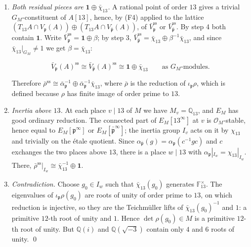 \documentclass[11pt]{article}
\newcommand{\Q}{\mathbb Q}
\newcommand{\F}{\mathbb F}
\begin{document}
\begin{enumerate}
\item \emph{Both residual pieces are \(\mathbf 1\oplus\bar\chi_{13}\).} A rational point of order \(13\) gives a
          trivial \(G_M\)-constituent of \(A[13]\), hence, by (F4) applied to the lattice
          \((T_{13}A\cap V_{\mathfrak p}(A))\oplus(T_{13}A\cap V_{\bar{\mathfrak p}}(A))\), of
          \(\bar V_{\mathfrak p}^{\mathrm{ss}}\) or \(\bar V_{\bar{\mathfrak p}}^{\mathrm{ss}}\). By step 4 both contain
          \(\mathbf 1\). Write \(\bar V_{\mathfrak p}^{\mathrm{ss}}=\mathbf 1\oplus\beta\); by step 3,
          \(\bar V_{\bar{\mathfrak p}}^{\mathrm{ss}}=\bar\chi_{13}\oplus\beta^{-1}\bar\chi_{13}\), and since
          \(\bar\chi_{13}|_{G_M}\neq1\) we get \(\beta=\bar\chi_{13}\):

\[
\bar V_{\mathfrak p}(A)^{\mathrm{ss}}\cong\bar V_{\bar{\mathfrak p}}(A)^{\mathrm{ss}}\cong\mathbf 1\oplus\bar\chi_{13}\qquad\text{as }G_M\text{-modules}.
\]

Therefore \(\bar\rho^{\mathrm{ss}}\cong\bar\alpha_{\mathfrak p}^{-1}\oplus\bar\alpha_{\mathfrak p}^{-1}\bar\chi_{13}\),
          where \(\bar\rho\) is the reduction of \(\iota_{\mathfrak p}\rho\), which is defined because \(\rho\) has
          finite image of order prime to \(13\).
\item \emph{Inertia above \(13\).} At each place \(v\mid13\) of \(M\) we have \(M_v=\Q_{13}\), and \(E_M\) has
          good ordinary reduction. The connected part of \(E_M[13^\infty]\) at \(v\) is \(\mathcal O_M\)-stable,
          hence equal to \(E_M[\mathfrak p^\infty]\) or \(E_M[\bar{\mathfrak p}^\infty]\); the inertia group \(I_v\)
          acts on it by \(\chi_{13}\) and trivially on the étale quotient. Since
          \(\alpha_{\bar{\mathfrak p}}(g)=\alpha_{\mathfrak p}(c^{-1}gc)\) and \(c\) exchanges the two places
          above \(13\), there is a place \(w\mid13\) with \(\alpha_{\mathfrak p}|_{I_w}=\chi_{13}|_{I_w}\).
          There, \(\bar\rho^{\mathrm{ss}}|_{I_w}\cong\bar\chi_{13}^{-1}\oplus\mathbf 1\).
\item \emph{Contradiction.} Choose \(g_0\in I_w\) such that \(\bar\chi_{13}(g_0)\) generates
          \(\F_{13}^\times\). The eigenvalues of \(\iota_{\mathfrak p}\rho(g_0)\) are roots of unity of order prime
          to \(13\), on which reduction is injective, so they are the Teichmüller lifts of
          \(\bar\chi_{13}(g_0)^{-1}\) and \(1\): a primitive \(12\)-th root of unity and \(1\). Hence
          \(\det\rho(g_0)\in M\) is a primitive \(12\)-th root of unity. But \(\Q(i)\) and \(\Q(\sqrt{-3})\)
          contain only \(4\) and \(6\) roots of unity. \qed
\end{enumerate}
\end{document}
